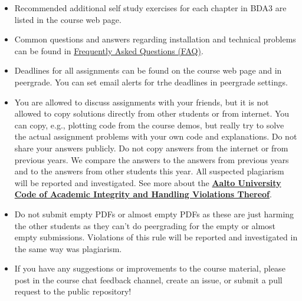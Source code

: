 \begin{itemize}
\item Recommended additional self study exercises for each chapter in BDA3 are listed in the course web page.
\item Common questions and answers regarding installation and technical problems can be found in \href{https://github.com/avehtari/BDA_course_Aalto/blob/master/FAQ.md}{Frequently Asked Questions (FAQ)}.
\item Deadlines for all assignments can be found on the course web page and in peergrade. You can set email alerts for trhe deadlines in peergrade settings.
\item You are allowed to discuss assignments with your friends, but it is not allowed to copy solutions directly from other students or from internet. You can copy, e.g., plotting code from the course demos, but really try to solve the actual assignment problems with your own code and explanations. Do not share your answers publicly. Do not copy answers from the internet or from previous years. We compare the answers to the answers from previous years and to the answers from other students this year. All suspected plagiarism will be reported and investigated. See more about the \href{https://into.aalto.fi/display/ensaannot/Aalto+University+Code+of+Academic+Integrity+and+Handling+Violations+Thereof}{\textbf{Aalto University Code of Academic Integrity and Handling Violations Thereof}}.
\item Do not submit empty PDFs or almost empty PDFs as these are just harming the other students as they can't do peergrading for the empty or almost empty submissions. Violations of this rule will be reported and investigated in the same way was plagiarism.
\item If you have any suggestions or improvements to the course material, please post in the course chat feedback channel, create an issue, or submit a pull request to the public repository!
\end{itemize}

